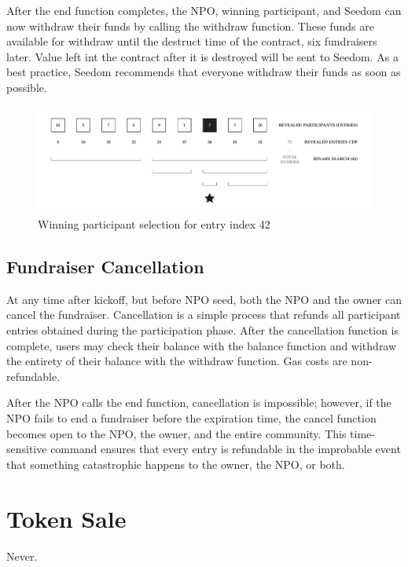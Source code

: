 \documentclass[11pt]{article}
\begin{document}
After the end function completes, the NPO, winning participant, and Seedom can now withdraw their funds by calling the withdraw function. These funds are available for withdraw until the destruct time of the contract, six fundraisers later. Value left int the contract after it is destroyed will be sent to Seedom. As a best practice, Seedom recommends that everyone withdraw their funds as soon as possible.

\begin{figure}[H]
\begin{center}
\includegraphics[width=1.0\textwidth]{./graphics/winningParticipantSelection.pdf}
\caption{Winning participant selection for entry index 42}
\label{figure:winningParticipantSelection}
\end{center}
\end{figure}

\subsection{Fundraiser Cancellation}

At any time after kickoff, but before NPO seed, both the NPO and the owner can cancel the fundraiser. Cancellation is a simple process that refunds all participant entries obtained during the participation phase. After the cancellation function is complete, users may check their balance with the balance function and withdraw the entirety of their balance with the withdraw function. Gas costs are non-refundable.

After the NPO calls the end function, cancellation is impossible; however, if the NPO fails to end a fundraiser before the expiration time, the cancel function becomes open to the NPO, the owner, and the entire community. This time-sensitive command ensures that every entry is refundable in the improbable event that something catastrophic happens to the owner, the NPO, or both.

\section{Token Sale}
Never.
\end{document}
